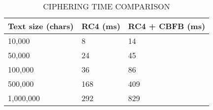 \documentclass[conference]{IEEEtran}
\begin{document}
\begin{table}[h]
\centering
\begin{tabular}{|l|l|l|}
\hline
Text size (chars) & RC4 (ms) & RC4 + CBFB (ms) \\ \hline
10,000                                                      & 8        & 14                                                         \\ \hline
50,000                                                      & 24       & 45                                                         \\ \hline
100,000                                                     & 36       & 86                                                         \\ \hline
500,000                                                     & 168      & 409                                                        \\ \hline
1,000,000                                                   & 292      & 829                                                        \\ \hline
\end{tabular}
\caption{CIPHERING TIME COMPARISON}
\label{ciphering-time}
\end{table}
\end{document}
